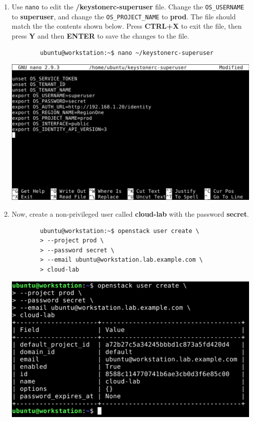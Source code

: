 \documentclass[letterpaper, 12pt]{article}
\begin{document}
\begin{enumerate}
    \item Use \texttt{nano} to edit the \textbf{\texttildemid/keystonerc-superuser} file. Change the
    \texttt{OS\_USERNAME} to \textbf{superuser}, and change the \texttt{OS\_PROJECT\_NAME} to \textbf{prod}. The file
    should match the the contents shown below. Press \textbf{CTRL+X} to exit the file, then press \textbf{Y} and then
    \textbf{ENTER} to save the changes to the file.
    \begin{lstlisting}
        ubuntu@workstation:~$ nano ~/keystonerc-superuser
    \end{lstlisting}    

    \begin{center}
        \includegraphics[width=\linewidth]{images/part1/step9.png}
    \end{center}

    \item Now, create a non-privileged user called \textbf{cloud-lab} with the password \textbf{secret}.
    \begin{lstlisting}
        ubuntu@workstation:~$ openstack user create \
        > --project prod \
        > --password secret \
        > --email ubuntu@workstation.lab.example.com \
        > cloud-lab
    \end{lstlisting}

    \begin{center}
        \includegraphics[width=\linewidth]{images/part1/step10.png}
    \end{center}


\end{enumerate}
\end{document}
